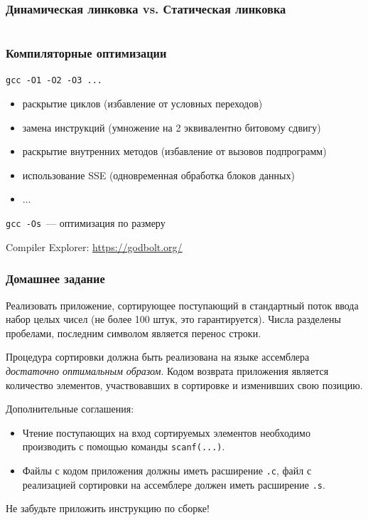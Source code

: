 \documentclass[aspectratio=169]{beamer}
\begin{document}
\begin{frame}
    \frametitle{Динамическая линковка vs. Статическая линковка}

    \inputminted[breaklines]{console}{sizes.txt}

\end{frame}







\begin{frame}
    \frametitle{Компиляторные оптимизации}

    \texttt{gcc -O1 -O2 -O3 ...}

    \begin{itemize}
        \item раскрытие циклов (избавление от условных переходов)
        \item замена инструкций (умножение на 2 эквивалентно битовому сдвигу)
        \item раскрытие внутренних методов (избавление от вызовов подпрограмм)
        \item использование SSE (одновременная обработка блоков данных)
        \item ...
    \end{itemize}

    \texttt{gcc -Os}~--- оптимизация по размеру

    Compiler Explorer: \url{https://godbolt.org/}

\end{frame}

\begin{frame}
    \frametitle{Домашнее задание}

    Реализовать приложение, сортирующее поступающий в стандартный поток ввода набор целых чисел (не более 100 штук, это гарантируется).
    Числа разделены пробелами, последним символом является перенос строки.

    Процедура сортировки должна быть реализована на языке ассемблера \textit{достаточно оптимальным образом}.
    Кодом возврата приложения является количество элементов, участвовавших в сортировке и изменивших свою позицию.

    Дополнительные соглашения:
    \begin{itemize}
        \item Чтение поступающих на вход сортируемых элементов необходимо производить с помощью команды \texttt{scanf(...)}.
        \item Файлы с кодом приложения должны иметь расширение \texttt{.c}, файл с реализацией сортировки на ассемблере должен иметь расширение \texttt{.s}.
    \end{itemize}

    \alert{Не забудьте приложить инструкцию по сборке!}

\end{frame}
\end{document}
